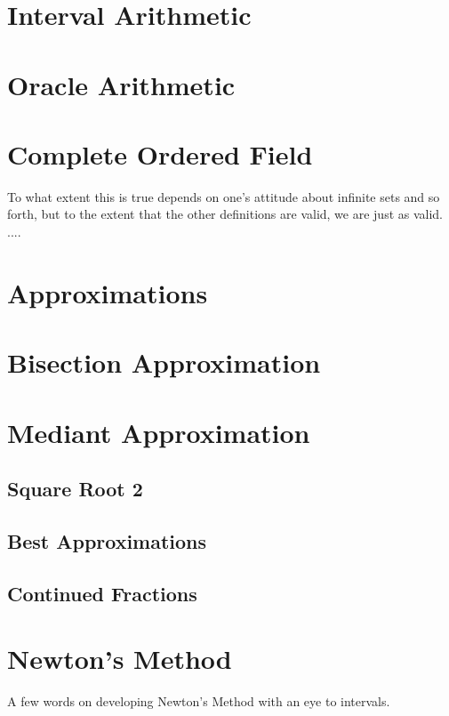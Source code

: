 \documentclass[12pt]{article}
\begin{document}
\section{Interval Arithmetic}

\section{Oracle Arithmetic}

\section{Complete Ordered Field}

To what extent this is true depends on one's attitude about infinite sets and so forth, but to the extent that the other definitions are valid, we are just as valid. ....

\section{Approximations}

\section{Bisection Approximation}

\section{Mediant Approximation}

\subsection{Square Root 2}

\subsection{Best Approximations}

\subsection{Continued Fractions}

\section{Newton's Method}

A few words on developing Newton's Method with an eye to intervals. 
\end{document}
